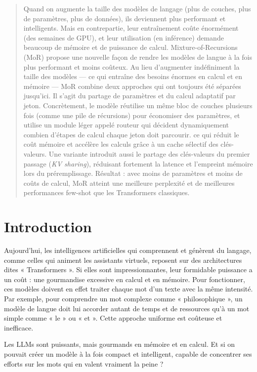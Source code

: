 \documentclass[a4paper]{article}
\begin{document}
\begin{abstract}
Quand on augmente la taille des modèles de langage (plus de couches,
plus de paramètres, plus de données), ils deviennent plus performant
et intelligents. Mais en contrepartie, leur entraînement coûte énormément
(des semaines de GPU), et leur utilisation (en inférence) demande beaucoup 
de mémoire et de puissance de calcul.
Mixture-of-Recursions (MoR) propose une nouvelle façon de rendre les modèles
de langue à la fois plus performant et moins coûteux.
Au lieu d’augmenter indéfiniment la taille des modèles — ce qui entraîne
des besoins énormes en calcul et en mémoire — MoR combine deux approches
qui ont toujours été séparées jusqu'ici. Il s'agit du partage de paramètres
et du calcul adaptatif par jeton.
Concrètement, le modèle réutilise un même bloc de couches plusieurs fois
(comme une pile de récursions) pour économiser des paramètres,
et utilise un module léger appelé routeur qui décident dynamiquement
combien d’étapes de calcul chaque jeton doit parcourir.
ce qui réduit le coût mémoire et accélère les calculs grâce
à un cache sélectif des clés-valeurs. Une variante introduit aussi le partage 
des clés-valeurs du premier passage (\textit{KV sharing}), réduisant fortement
la latence et l’empreint mémoire lors du préremplissage.
Résultat : avec moins de paramètres et moins de coûts de calcul,
MoR atteint une meilleure perplexité et de meilleures performances
few-shot que les Transformers classiques.
\end{abstract}



\newpage
\tableofcontents
\newpage

\section{Introduction}
Aujourd'hui, les intelligences artificielles qui comprennent et génèrent
du langage, comme celles qui animent les assistants virtuels, reposent
sur des architectures dites « Transformers ». Si elles sont impressionnantes,
leur formidable puissance a un coût : une gourmandise excessive en calcul
et en mémoire. Pour fonctionner, ces modèles doivent en effet traiter
chaque mot d'un texte avec la même intensité. Par exemple, pour comprendre
un mot complexe comme « philosophique », un modèle de langue doit lui accorder
autant de temps et de ressources qu’à un mot simple comme « le » ou « et ».
Cette approche uniforme est coûteuse et inefficace.

Les LLMs sont puissants, mais gourmands en mémoire et en calcul.
Et si on pouvait créer un modèle à la fois compact et intelligent,
capable de concentrer ses efforts sur les mots qui en valent vraiment
la peine ?
\end{document}
